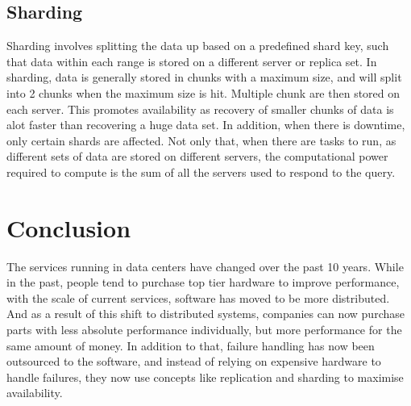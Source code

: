 \documentclass[]{article}
\begin{document}
\subsection{Sharding}

Sharding involves splitting the data up based on a predefined shard key, such that data within each range is stored on a different server or replica set. In sharding, data is generally stored in chunks with a maximum size, and will split into 2 chunks when the maximum size is hit. Multiple chunk are then stored on each server. This promotes availability as recovery of smaller chunks of data is alot faster than recovering a huge data set. In addition, when there is downtime, only certain shards are affected. Not only that, when there are tasks to run, as different sets of data are stored on different servers, the computational power required to compute is the sum of all the servers used to respond to the query. \\

\section{Conclusion}

The services running in data centers have changed over the past 10 years. While in the past, people tend to purchase top tier hardware to improve performance, with the scale of current services, software has moved to be more distributed. And as a result of this shift to distributed systems, companies can now purchase parts with less absolute performance individually, but more performance for the same amount of money. In addition to that, failure handling has now been outsourced to the software, and instead of relying on expensive hardware to handle failures, they now use concepts like replication and sharding to maximise availability. \\
\end{document}
